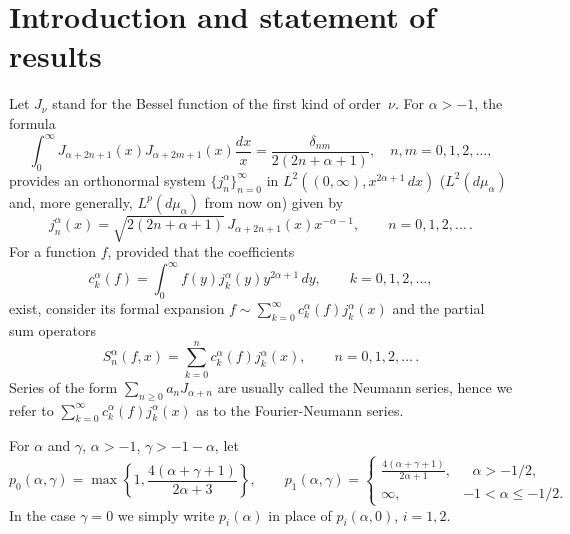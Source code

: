 \documentclass[a4paper]{amsart}
\newcommand{\mua}{d\mu_\alpha}
\begin{document}
\maketitle

\section{Introduction and statement of results}
\label{sec:intro}

Let $J_\nu$ stand for the Bessel function of the first kind of order~$\nu$.
For $\alpha>-1$, the formula
\begin{equation*}
  \int_0^\infty J_{\alpha+2n+1}(x)J_{\alpha+2m+1}(x)\frac{dx}{x}
  = \frac{\delta_{nm}}{2(2n+\alpha+1)},
  \quad n,m = 0,1,2,\dots,
\end{equation*}
provides an orthonormal system $\{j_n^\alpha\}_{n=0}^\infty$ in
$L^2((0,\infty),x^{2\alpha+1}\,dx)$ ($L^2(\mua)$ and, more generally, $L^p(\mua)$
from now on) given by
\begin{equation*}
  j_n^\alpha(x) = \sqrt{2(2n+\alpha+1)}\,J_{\alpha+2n+1}(x) x^{-\alpha-1},
  \qquad n = 0,1,2,\dots\,.
\end{equation*}
For a function $f$, provided that the coefficients
\begin{equation*}
  c_k^\alpha(f) = \int_0^\infty f(y)j_k^\alpha(y) y^{2\alpha+1}\,dy,
  \qquad k = 0,1,2,\dots,
\end{equation*}
exist, consider its formal expansion
$f\sim \sum_{k=0}^\infty c_k^\alpha(f) j_k^\alpha(x)$ and the partial sum
operators
\begin{equation*}
  S_n^\alpha(f,x) = \sum_{k=0}^n c_k^\alpha(f) j_k^\alpha(x),
  \qquad n = 0,1,2,\dots\,.
\end{equation*}
Series of the form $\sum_{n\ge0} a_n J_{\alpha+n}$ are usually
called the Neumann series, hence we refer to $\sum_{k=0}^\infty c_k^\alpha(f)
j_k^\alpha(x)$ as to the Fourier-Neumann series.

For $\alpha$ and $\gamma$, $\alpha>-1$, $\gamma>-1-\alpha$, let
\begin{equation*}
  p_0(\alpha,\gamma) = \max\left\{1,\frac{4(\alpha+\gamma+1)}{2\alpha+3}\right\},
  \qquad p_1(\alpha,\gamma) =
  \begin{cases}
    \frac{4(\alpha+\gamma+1)}{2\alpha+1},&\text{ $\alpha>-1/2$}, \\
    \infty, &\text{$-1<\alpha\le-1/2$}.
  \end{cases}
\end{equation*}
In the case $\gamma=0$ we simply write $p_i(\alpha)$ in place of $p_i(\alpha,0)$, $i=1,2$.
\end{document}
